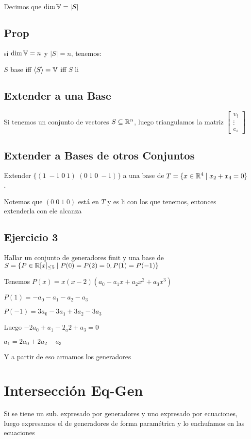 \documentclass{article}
\begin{document}
	Decimos que $\dim \mathbb{V} = |S|$

	\subsection{Prop}
	si $\dim \mathbb{V} = n$ y $|S| = n$, tenemos:
	
	$S$ base iff $\langle S \rangle = \mathbb{V}$ iff $S$ li

	\subsection{Extender a una Base}
	Si tenemos un conjunto de vectores $S \subseteq \mathbb{R}^n$, luego triangulamos la
	matriz \(
	\begin{bmatrix}
		v_i \\
		\vdots \\
		e_i
	\end{bmatrix}
	\)

	\subsection{Extender a Bases de otros Conjuntos}
	Extender $\{(1 \; -1 \; 0 \; 1) \; (0 \; 1\; 0 \; -1)\}$ a una base de
	$T = \{x \in \mathbb{R}^4 \mid x_2 + x_4 = 0\}$.

	Notemos que $(0 \; 0\; 1\;0)$ está en $T$ y es li con los que tenemos, entonces
	extenderla con ele alcanza

	\subsection{Ejercicio 3}
	Hallar un conjunto de generadores finit y una base de $S = \{P \in \mathbb{R}[x]_{\leq 5} \mid
		P(0) = P(2) = 0, P(1) = P(-1)
	\}$

	Tenemos $P(x) = x(x-2)(a_0 + a_1x + a_2x^2 + a_3x^3)$

	$P(1) = -a_0 - a_1 - a_2 - a_3$

	$P(-1) = 3a_0 - 3a_1 + 3a_2 - 3a_3$

	Luego $-2 a_0 + a_1 - 2_a2 + a_3 = 0$

	$a_1 = 2a_0 + 2a_2 - a_3$ 

	Y a partir de eso armamos los generadores

	\section{Intersección Eq-Gen}
	Si se tiene un sub. expresado por generadores y uno expresado por ecuaciones, luego
	expresamos el de generadores de forma paramétrica y lo enchufamos en las ecuaciones
\end{document}
